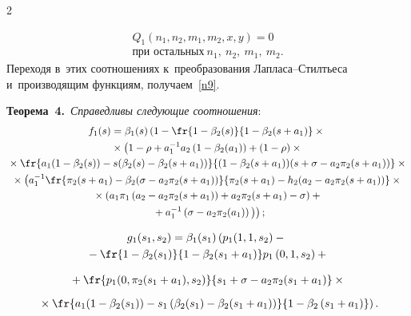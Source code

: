 \begin{multicols}{2}
\vspace*{-12pt}

\noindent
\begin{multline*}
Q_1\left(n_1,n_2,m_1,m_2,x,y\right)=0 \\
 \mbox{при остальных}\ n_1,\ n_2,\ m_1,\ m_2.
\end{multline*}
Переходя в~этих соотношениях к~преобразования Лап\-ла\-са--Стилть\-еса 
и~производящим функциям, получаем~\eqref{n9}.



\noindent
\textbf{Теорема~4.}\
\textit{Справедливы следующие соотношения}:
\begin{multline*}
f_1(s)=\beta_1(s)\left(1-\fr{1-\beta_2(s)}{1-\beta_2(s+a_1)}\times{}\right.\\
\left.{}\times
\left(1-\rho+a_1^{-1}a_2\left(1-\beta_2(a_1)\right)+
(1-\rho)\times{}\right.\right.
\\
{}\times
\fr{a_1(1-\beta_2(s))-s(\beta_2(s)-\beta_2(s+a_1))}
{(1-\beta_2(s+a_1))(s+\sigma-a_2\pi_2(s+a_1))}\times{}\\
{}\times 
\left(a_1^{-1}
\fr{\pi_2(s+a_1)-\beta_2(\sigma-a_2\pi_2(s+a_1))}
{\pi_2(s+a_1)-h_2(a_2-a_2\pi_2(s+a_1))}\times{} \right.
\\
{}\times
\left(a_1\pi_1\left(a_2-a_2\pi_2(s+a_1)\right)+a_2\pi_2(s+a_1)-\sigma\right)+{}\\
\left.\left.{}+a_1^{-1}\left(\sigma-a_2\pi_2(a_1)\right)
\vphantom{\fr{1-\beta_2(s)}{1-\beta_2(s+a_1)}}
\right)\right);
\end{multline*}

\vspace*{-22pt}

\noindent
\begin{multline*}
g_1(s_1,s_2)=\beta_1(s_1)\left(
\vphantom{\fr{1-\beta_2(s_1)}{1-\beta_2(s_1+a_1)}}
p_1(1,1,s_2)-{}\right.\\
{}-
\fr{1-\beta_2(s_1)}{1-\beta_2(s_1+a_1)}
p_1\left(0,1,s_2\right)+{}
\end{multline*}

\noindent
\begin{multline*}
{}+
\fr{p_1(0,\pi_2(s_1+a_1),s_2)}
{s_1+\sigma-a_2\pi_2(s_1+a_1)}\times{}\\[6pt]
\left.{}\times
\fr{a_1(1-\beta_2(s_1))-s_1\left(\beta_2(s_1)-\beta_2(s_1+a_1)\right)}
{1-\beta_2\left(s_1+a_1\right)}\right).
\end{multline*}

\vspace*{-16pt}


\end{multicols}
